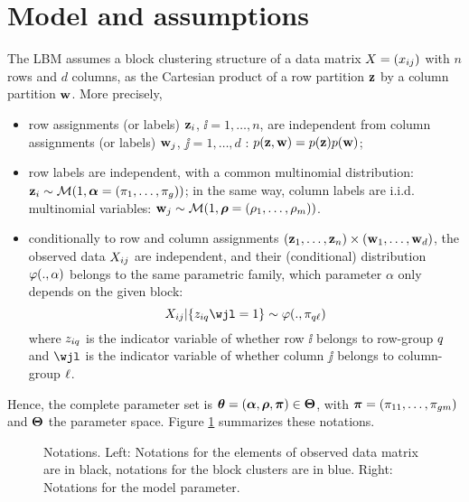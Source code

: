 \documentclass[bj]{imsart}
\numberwithin{equation}{section}
\theoremstyle{plain}
\theoremstyle{remark}
\begin{document}
\section{Model and assumptions}
\label{sec:ModelAndAssumptions}
The LBM assumes a block clustering structure of a data matrix $X=(x_{ij})$ with $n$ rows and $d$ columns, as the Cartesian product of a row partition $\mathbf{z}$ by a column partition $\mathbf{w}$. More precisely,
\begin{itemize}
\item row assignments (or labels) $\mathbf{z}_{i}$, $\ii=1,\ldots, n$, are independent from column assignments (or labels) $\mathbf{w}_{j}$, $\jj=1,\ldots,d$ : $p(\mathbf{z}, \mathbf{w})=p(\mathbf{z})p(\mathbf{w})$;
\item  row labels are independent, with a common multinomial distribution:  $\mathbf{z}_i\sim \mathcal{M}(1, \boldsymbol{\alpha}=(\pi_1,\ldots,\pi_g))$; in the same way, column labels are i.i.d. multinomial variables: $\mathbf{w}_j\sim \mathcal{M}(1, \boldsymbol{\rho}=(\rho_1,\ldots,\rho_m))$. 
\item conditionally to row and column assignments $(\mathbf{z}_1, \dots, \mathbf{z}_{n})\times(\mathbf{w}_{1}, \dots, \mathbf{w}_{d})$, the observed data $X_{ij}$ are independent, and their (conditional)  distribution $\varphi(.,\alpha)$ belongs to the same parametric family, which parameter $\alpha$ only depends on the given block:
  \begin{equation*}
    \label{eq:distribution-conditionnelle}
    \Xij |\{ \zik\wjl = 1 \}\sim \dens(., \al_{\kk\el})
  \end{equation*}
  where $z_{iq}$  is the indicator variable of whether row $\ii$ belongs to row-group $q$ and $\wjl$  is the indicator variable of whether column $\jj$ belongs to column-group $\ell$.
\end{itemize}
Hence, the  complete parameter set is $\boldsymbol{\theta}=(\boldsymbol{\alpha},\boldsymbol{\rho},\boldsymbol{\pi})\in\boldsymbol{\Theta}$, with $\boldsymbol{\pi}=(\pi_{11}, \dots, \pi_{gm})$ and  $\boldsymbol{\Theta}$  the parameter space.  Figure \ref{Fig:notations} summarizes these notations.

\begin{figure}[!h]

\caption{\label{Fig:notations} Notations. Left: Notations for the elements of observed data matrix are in black, notations for the block clusters are in blue. Right: Notations for the model parameter.}
\end{figure}
\end{document}
